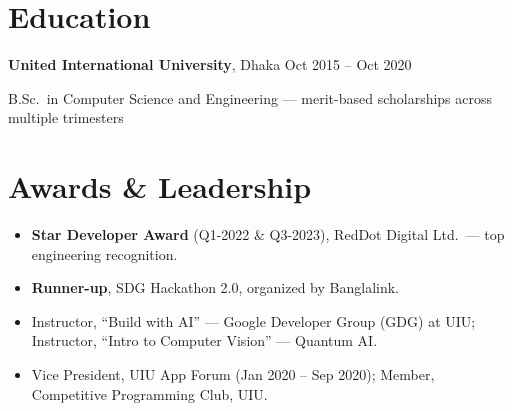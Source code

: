 \documentclass[10pt,a4paper]{article}
\begin{document}
\section{Education}
\textbf{United International University}, Dhaka \hfill Oct 2015 -- Oct 2020\par
B.Sc.\ in Computer Science and Engineering --- merit-based scholarships across multiple trimesters

\section{Awards \& Leadership}
\begin{itemize}
  \item \textbf{Star Developer Award} (Q1-2022 \& Q3-2023), RedDot Digital Ltd.\ --- top engineering recognition.
  \item \textbf{Runner-up}, SDG Hackathon 2.0, organized by Banglalink.
  \item Instructor, ``Build with AI'' --- Google Developer Group (GDG) at UIU; Instructor, ``Intro to Computer Vision'' --- Quantum AI.
  \item Vice President, UIU App Forum (Jan 2020 -- Sep 2020); Member, Competitive Programming Club, UIU.
\end{itemize}
\end{document}
